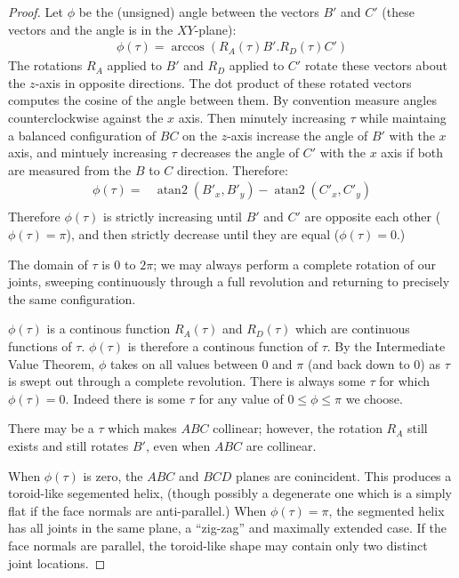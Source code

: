 \documentclass[11pt]{article}
\DeclareMathOperator{\atantwo}{atan2}
\begin{document}
{\begin{proof}
    Let $\phi$ be the (unsigned) angle between the vectors $B'$ and $C'$ (these vectors and the angle is in the $XY$-plane):
    \begin{align}
      \phi(\tau) = \arccos{( R_A(\tau)B' . R_D(\tau)C')}
      \end{align}
    The rotations $R_A$ applied to $B'$ and $R_D$ applied to $C'$
    rotate these vectors about the $z$-axis in opposite directions. The dot product of these rotated vectors
    computes the cosine of the angle between them.
    By convention measure angles counterclockwise against the $x$ axis.
    Then minutely increasing $\tau$ while maintaing a balanced configuration
    of $BC$ on the $z$-axis increase the angle of $B'$ with the $x$ axis,
    and mintuely increasing $\tau$ decreases the angle of $C'$ with the $x$ axis
    if both are measured from the $B$ to $C$ direction. Therefore:
    \begin{align}
      \phi(\tau) = & \atantwo(B'_x,B'_y) - \atantwo(C'_x,C'_y) \\
    \end{align}
    Therefore  $\phi(\tau)$ is strictly increasing until $B'$ and $C'$ are opposite
    each other ($\phi(\tau) = \pi$), and then strictly decrease until they are equal
    ($\phi(\tau) = 0$.)

    The domain of $\tau$ is $0$ to $2\pi$; we may always perform
    a complete rotation of our joints, sweeping continuously through
    a full revolution and returning to precisely the same configuration.

    $\phi(\tau)$ is a continous function $R_A(\tau)$ and $R_D(\tau)$ which are continuous
    functions of $\tau$. $\phi(\tau)$ is therefore a continous function
    of $\tau$. By the Intermediate Value Theorem, $\phi$
    takes on all values between $0$ and $\pi$ (and back down to $0$) as $\tau$ is swept out through a complete revolution.
    There is always some $\tau$ for which $\phi(\tau) = 0$.
    Indeed there is some $\tau$ for any value of $0 \leq \phi \leq \pi$ we choose.

    There may be a $\tau$ which makes $ABC$ collinear; however,
    the rotation $R_A$ still exists and still rotates $B'$, even
    when $ABC$ are collinear.

    When $\phi(\tau)$ is zero, the $ABC$ and $BCD$ planes are conincident.
    This produces a toroid-like segemented helix, (though possibly
    a degenerate one which is a simply flat if the face normals are
    anti-parallel.) When $\phi(\tau) = \pi$, the segmented helix
    has all joints in the same plane, a ``zig-zag'' and maximally extended
    case. If the face normals are parallel, the toroid-like shape may contain
    only two distinct joint locations.


\end{proof}}
\end{document}
